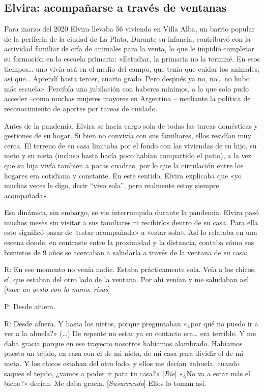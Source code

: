 \begin{refsection}
\subsection[Elvira: acompañarse a través de ventanas]{Elvira: acompañarse a través de ventanas}
\label{cap-30.elvira-acompanarse-a-traves-de-ventanas}
Para marzo del 2020 Elvira llevaba 56 viviendo en Villa Alba, un barrio popular de la periferia de la ciudad de La Plata. Durante su infancia, contribuyó con la actividad familiar de cría de animales para la venta, lo que le impidió completar su formación en la escuela primaria: «Estudiar, la primaria no la terminé. En esos tiempos… uno vivía acá en el medio del campo, que tenía que cuidar los animales, así que… Aprendí hasta tercer, cuarto grado. Pero después ya no, no… no hubo más escuela». Percibía una jubilación con haberes mínimos, a la que solo pudo acceder –como muchas mujeres mayores en Argentina \protect\parencite{4206-VENTURIELLO2023} – mediante la política de reconocimiento de aportes por tareas de cuidado.

Antes de la pandemia, Elvira se hacía cargo sola de todas las tareas domésticas y gestiones de su hogar. Si bien no convivía con sus familiares, ellos residían muy cerca. El terreno de su casa limitaba por el fondo con las viviendas de su hijo, su nieto y su nieta (incluso hasta hacía poco habían compartido el patio), a la vez que su hija vivía también a pocas cuadras, por lo que la circulación entre los hogares era cotidiana y constante. En este sentido, Elvira explicaba que «yo muchas veces le digo, decir “vivo sola”, pero realmente estoy siempre acompañada».

Esa dinámica, sin embargo, se vio interrumpida durante la pandemia. Elvira pasó muchos meses sin visitar a sus familiares ni recibirlos dentro de su casa. Para ella esto significó pasar de «estar acompañada» a «estar sola». Así lo relataba en una escena donde, en contraste entre la proximidad y la distancia, contaba cómo sus bisnietos de 9 años se acercaban a saludarla a través de la ventana de su casa:


\begin{gbcita}
R: En ese momento no venía nadie. Estaba prácticamente sola. Veía a los chicos, sí, que estaban del otro lado de la ventana. Por ahí venían y me saludaban así [\emph{hace un gesto con la mano, risas}]

P: Desde afuera.

R: Desde afuera. Y hasta los nietos, porque preguntaban «¿por qué no puedo ir a ver a la abuela?» (…) De repente no estar ya en contacto era… era terrible. Y me daba gracia porque en ese trayecto nosotros habíamos alambrado. Habíamos puesto un tejido, en casa con el de mi nieta, de mi casa para dividir el de mi nieta. Y los chicos estaban del otro lado, y ellos me decían «abuela, cuando saques el tejido, ¿vamos a poder ir para tu casa?» [\emph{Ríe}] «¿No va a estar más el bicho?» decían. Me daba gracia. [\emph{Susurrando}] Ellos lo toman así.


\end{gbcita}
\end{refsection}
